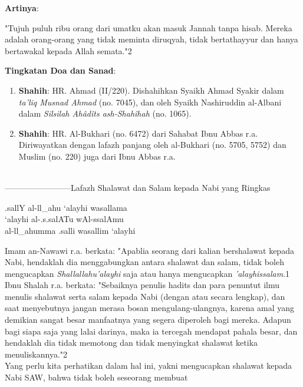 \documentclass[a4paper,12pt]{article}
\begin{document}
\noindent
\textbf{Artinya}:
\par
\indent
"Tujuh puluh ribu orang dari umatku akan masuk Jannah tanpa hisab. Mereka 
adalah orang-orang yang tidak meminta diruqyah, tidak bertathayyur dan 
hanya bertawakal kepada Allah semata."{\scriptsize 2}\\
\par
\noindent
\textbf{Tingkatan Doa dan Sanad}:
\begin{enumerate}
\item \textbf{Shahih}: HR. Ahmad (II/220). Dishahihkan Syaikh Ahmad Syakir 
dalam \textit{ta'liq Musnad Ahmad} (no. 7045), dan oleh Syaikh Nashiruddin 
al-Albani dalam \textit{Silsilah Ah\^{a}d\^{i}ts ash-Shah\^{i}hah} (no. 
1065).
\item \textbf{Shahih}: HR. Al-Bukhari (no. 6472) dari Sahabat Ibnu Abbas 
r.a. Diriwayatkan dengan lafazh panjang oleh al-Bukhari (no. 5705, 5752) 
dan Muslim (no. 220) juga dari Ibnu Abbas r.a.\\\\
\end{enumerate}
\par
{}------------------------Lafazh Shalawat dan Salam kepada Nabi yang Ringkas\\
\begin{arabtext}
.sallY al-ll_ahu `alayhi wasallama\\
`alayhi al-.s.salATu wAl-ssalAmu\\
al-ll_ahumma .salli wasallim `alayhi\\
\end{arabtext}
\par
\indent Imam an-Nawawi r.a. berkata: "Apablia seorang dari kalian 
bershalawat kepada Nabi, hendaklah dia menggabungkan antara shalawat dan 
salam, tidak boleh mengucapkan \textit{Shallallahu'alayhi} saja atau hanya 
mengucapkan \textit{'alayhissalam}.{\scriptsize 1}\\
\indent Ibnu Shalah r.a. berkata: "Sebaiknya penulis hadits dan para 
penuntut ilmu menulis shalawat serta salam kepada Nabi (dengan atau secara 
lengkap), dan saat menyebutnya jangan merasa bosan mengulang-ulangnya, 
karena amal yang demikian sangat besar manfaatnya yang segera diperoleh 
bagi mereka. Adapun bagi siapa saja yang lalai darinya, maka ia tercegah 
mendapat pahala besar, dan hendaklah dia tidak memotong dan tidak 
menyingkat shalawat ketika menuliskannya."{\scriptsize 2}\\
\indent Yang perlu kita perhatikan dalam hal ini, yakni mengucapkan 
shalawat kepada Nabi SAW, bahwa tidak boleh seseorang membuat 
\end{document}
